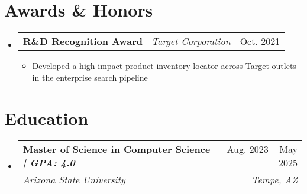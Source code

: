 \documentclass[letterpaper,11pt]{article}
\makeatletter
\newcommand{\resumeItem}[1]{
  \item\small{
    {#1 \vspace{-1pt}}
  }
}
\newcommand{\resumeSubheading}[4]{
  \vspace{-2pt}\item
    \begin{tabular*}{0.97\textwidth}[t]{l@{\extracolsep{\fill}}r}
      \textbf{#1} & #2 \\
      \textit{\small#3} & \textit{\small #4} \\
    \end{tabular*}\vspace{-7pt}
}
\newcommand{\resumeProjectHeading}[2]{
    \item
    \begin{tabular*}{0.97\textwidth}{l@{\extracolsep{\fill}}r}
      \small#1 & #2 \\
    \end{tabular*}\vspace{-7pt}
}
\newcommand{\resumeSubHeadingListStart}{\begin{itemize}[leftmargin=0.15in, label={}]}
\newcommand{\resumeSubHeadingListEnd}{\end{itemize}}
\newcommand{\resumeItemListStart}{\begin{itemize}}
\newcommand{\resumeItemListEnd}{\end{itemize}\vspace{-5pt}}
\makeatother
\begin{document}
\section{Awards \& Honors}
    \resumeSubHeadingListStart
      \resumeProjectHeading
          {\textbf{R\&D Recognition Award} $|$ \emph{Target Corporation}}{Oct. 2021}
          \resumeItemListStart
            \resumeItem{Developed a high impact product inventory locator across Target outlets in the enterprise search pipeline}
          \resumeItemListEnd
    \resumeSubHeadingListEnd

\section{Education}
  \resumeSubHeadingListStart
    \resumeSubheading
      {Master of Science in Computer Science \textnormal{\textit{| GPA: 4.0}}}{Aug. 2023 -- May 2025}
      {Arizona State University}{Tempe, AZ}
  \resumeSubHeadingListEnd


\end{document}

